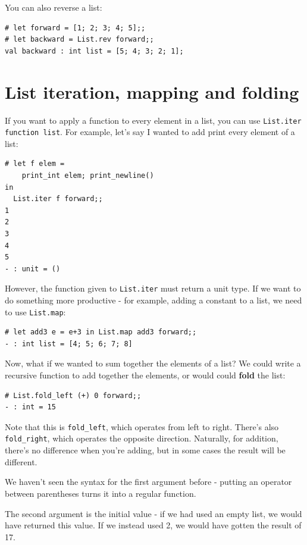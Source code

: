 \documentclass[10pt]{book}
\begin{document}
You can also reverse a list:

\beforeverb
\begin{verbatim}
# let forward = [1; 2; 3; 4; 5];;
# let backward = List.rev forward;;
val backward : int list = [5; 4; 3; 2; 1];
\end{verbatim}
\afterverb

\section{List iteration, mapping and folding}

If you want to apply a function to every element in a list, 
you can use {\tt List.iter function list}. For example, let's say I wanted 
to add print every element of a list:

\beforeverb
\begin{verbatim}
# let f elem = 
    print_int elem; print_newline()
in
  List.iter f forward;;
1
2
3
4
5
- : unit = ()
\end{verbatim}
\afterverb

However, the function given to {\tt List.iter} must return a 
unit type. If we want to do something more productive - for 
example, adding a constant to a list, we need to use {\tt List.map}:

\beforeverb
\begin{verbatim}
# let add3 e = e+3 in List.map add3 forward;;
- : int list = [4; 5; 6; 7; 8]
\end{verbatim}
\afterverb

Now, what if we wanted to sum together the elements of a list? 
We could write a recursive function to add together the elements, 
or would could {\bf fold} the list:

\beforeverb
\begin{verbatim}
# List.fold_left (+) 0 forward;;
- : int = 15
\end{verbatim}
\afterverb

Note that this is {\tt \verb"fold_left"}, which operates from left to right. 
There's also {\tt \verb"fold_right"}, which operates the opposite direction. 
Naturally, for addition, there's no difference when you're adding, but 
in some cases the result will be different.

We haven't seen the syntax for the first argument before - putting an operator 
between parentheses turns it into a regular function.

The second argument is the initial value - if we had used an empty list, we 
would have returned this value. If we instead used 2, we would have gotten the 
result of 17.
\end{document}
